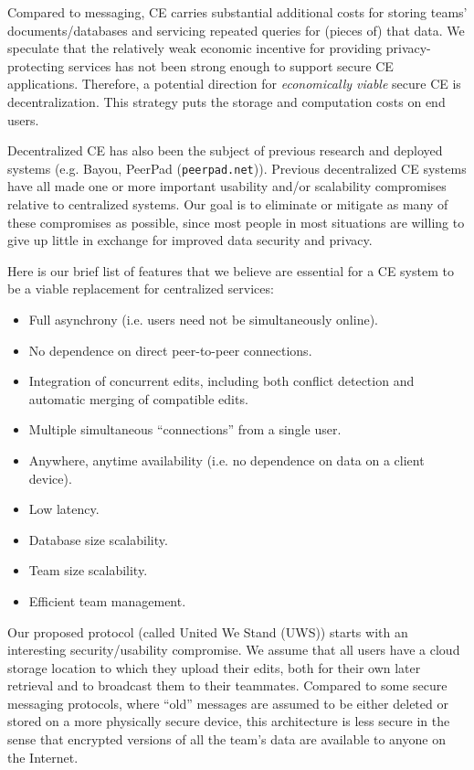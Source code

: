 \documentclass[runningheads]{llncs}
\begin{document}
Compared to messaging, CE carries substantial additional costs for storing teams' documents{\slash}databases and servicing repeated queries for (pieces of) that data.
We speculate that the relatively weak economic incentive for providing privacy-protecting services has not been strong enough to support secure CE applications.
Therefore, a potential direction for \emph{economically viable} secure CE is decentralization.
This strategy puts the storage and computation costs on end users.\footnotemark{}


Decentralized CE has also been the subject of previous research and deployed systems (e.g. Bayou\cite{Terry1995}, PeerPad (\texttt{peerpad.net})).
Previous decentralized CE systems have all made one or more important usability and{\slash}or scalability compromises relative to centralized systems.
Our goal is to eliminate or mitigate as many of these compromises as possible, since most people in most situations are willing to give up little in exchange for improved data security and privacy\cite{Acquisti2013}.

Here is our brief list of features that we believe are essential for a CE system to be a viable replacement for centralized services:

\begin{itemize}
\item Full asynchrony (i.e. users need not be simultaneously online).
\item No dependence on direct peer-to-peer connections.
\item Integration of concurrent edits, including both conflict detection and automatic merging of compatible edits.
\item Multiple simultaneous ``connections'' from a single user.
\item Anywhere, anytime availability (i.e. no dependence on data on a client device).
\item Low latency.
\item Database size scalability.
\item Team size scalability.
\item Efficient team management.
\end{itemize}

Our proposed protocol (called United We Stand (UWS)) starts with an interesting security{\slash}usability compromise.
We assume that all users have a cloud storage location to which they upload their edits, both for their own later retrieval and to broadcast them to their teammates.
Compared to some secure messaging protocols, where ``old'' messages are assumed to be either deleted or stored on a more physically secure device, this architecture is less secure in the sense that encrypted versions of all the team's data are available to anyone on the Internet.
\end{document}
